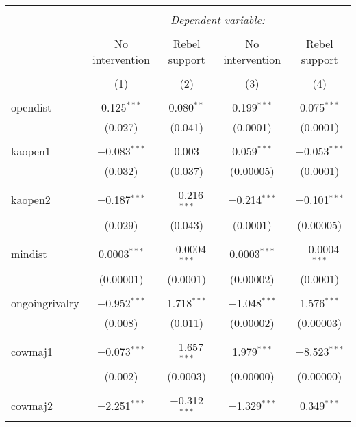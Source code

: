 
\begin{table}[!htbp] \centering 
  \caption{} 
  \label{} 
\begin{tabular}{@{\extracolsep{5pt}}lcccc} 
\\[-1.8ex]\hline 
\hline \\[-1.8ex] 
 & \multicolumn{4}{c}{\textit{Dependent variable:}} \\ 
\cline{2-5} 
\\[-1.8ex] & No intervention & Rebel support & No intervention & Rebel support \\ 
\\[-1.8ex] & (1) & (2) & (3) & (4)\\ 
\hline \\[-1.8ex] 
 opendist & 0.125$^{***}$ & 0.080$^{**}$ & 0.199$^{***}$ & 0.075$^{***}$ \\ 
  & (0.027) & (0.041) & (0.0001) & (0.0001) \\ 
  & & & & \\ 
 kaopen1 & $-$0.083$^{***}$ & 0.003 & 0.059$^{***}$ & $-$0.053$^{***}$ \\ 
  & (0.032) & (0.037) & (0.00005) & (0.0001) \\ 
  & & & & \\ 
 kaopen2 & $-$0.187$^{***}$ & $-$0.216$^{***}$ & $-$0.214$^{***}$ & $-$0.101$^{***}$ \\ 
  & (0.029) & (0.043) & (0.0001) & (0.00005) \\ 
  & & & & \\ 
 mindist & 0.0003$^{***}$ & $-$0.0004$^{***}$ & 0.0003$^{***}$ & $-$0.0004$^{***}$ \\ 
  & (0.00001) & (0.0001) & (0.00002) & (0.0001) \\ 
  & & & & \\ 
 ongoingrivalry & $-$0.952$^{***}$ & 1.718$^{***}$ & $-$1.048$^{***}$ & 1.576$^{***}$ \\ 
  & (0.008) & (0.011) & (0.00002) & (0.00003) \\ 
  & & & & \\ 
 cowmaj1 & $-$0.073$^{***}$ & $-$1.657$^{***}$ & 1.979$^{***}$ & $-$8.523$^{***}$ \\ 
  & (0.002) & (0.0003) & (0.00000) & (0.00000) \\ 
  & & & & \\ 
 cowmaj2 & $-$2.251$^{***}$ & $-$0.312$^{***}$ & $-$1.329$^{***}$ & 0.349$^{***}$ \\ 

\end{tabular}
\end{table}
